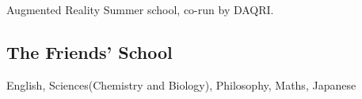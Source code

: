 \documentclass[a4paper]{deedy-resume} %
\begin{document}
\begin{minipage}[t]{0.33\textwidth}

Augmented Reality Summer school, co-run by DAQRI. \\

\sectionspace %


\subsection{The Friends' School}

English, Sciences(Chemistry and Biology), Philosophy, Maths, Japanese \\

\sectionspace %




\end{minipage}
\end{document}
